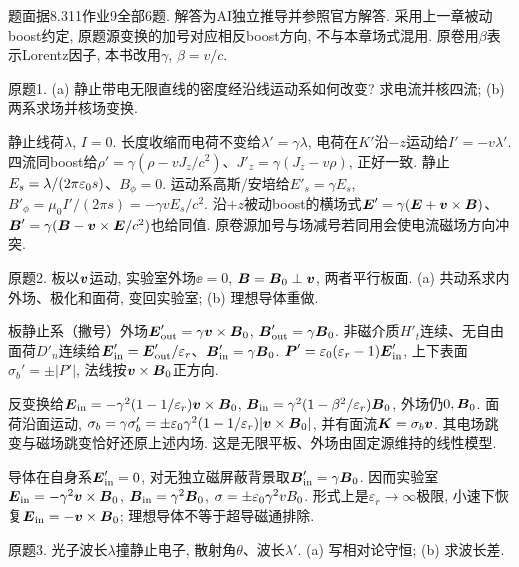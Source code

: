 题面据8.311作业9全部6题. 解答为AI独立推导并参照官方解答. 采用上一章被动boost约定, 原题源变换的加号对应相反boost方向, 不与本章场式混用. 原卷用$\beta$表示Lorentz因子, 本书改用$\gamma$, $\beta=v/c$.
\begin{exercise}
原题1. (a) 静止带电无限直线的密度经沿线运动系如何改变? 求电流并核四流; (b) 两系求场并核场变换.
\end{exercise}
\begin{solution}
静止线荷$\lambda$, $I=0$. 长度收缩而电荷不变给$\lambda'=\gamma\lambda$, 电荷在$K'$沿$-z$运动给$I'=-v\lambda'$. 四流同boost给$\rho'=\gamma(\rho-vJ_z/c^2)$、$J'_z=\gamma(J_z-v\rho)$, 正好一致. 静止$E_s=\lambda/(2\pi\varepsilon_0 s)$、$B_\phi=0$. 运动系高斯/安培给$E'_s=\gamma E_s$, $B'_\phi=\mu_0 I'/(2\pi s)=-\gamma vE_s/c^2$. 沿$+z$被动boost的横场式$\boldsymbol{E}'=\gamma(\boldsymbol{E}+\boldsymbol{v}\times\boldsymbol{B})$、$\boldsymbol{B}'=\gamma(\boldsymbol{B}-\boldsymbol{v}\times\boldsymbol{E}/c^2)$也给同值. 原卷源加号与场减号若同用会使电流磁场方向冲突.
\end{solution}
\begin{exercise}
原题2. 板以$\boldsymbol{v}$运动, 实验室外场$\ee=0$, $\boldsymbol{B}=\boldsymbol{B}_0\perp\boldsymbol{v}$, 两者平行板面. (a) 共动系求内外场、极化和面荷, 变回实验室; (b) 理想导体重做.
\end{exercise}
\begin{solution}
板静止系（撇号）外场$\boldsymbol{E}'_{\rm out}=\gamma\boldsymbol{v}\times\boldsymbol{B}_0$, $\boldsymbol{B}'_{\rm out}=\gamma\boldsymbol{B}_0$. 非磁介质$H'_t$连续、无自由面荷$D'_n$连续给$\boldsymbol{E}'_{\rm in}=\boldsymbol{E}'_{\rm out}/\varepsilon_r$、$\boldsymbol{B}'_{\rm in}=\gamma\boldsymbol{B}_0$. $\boldsymbol{P}'=\varepsilon_0(\varepsilon_r-1)\boldsymbol{E}'_{\rm in}$, 上下表面$\sigma_b'=\pm|P'|$, 法线按$\boldsymbol{v}\times\boldsymbol{B}_0$正方向.

反变换给$\boldsymbol{E}_{\rm in}=-\gamma^2(1-1/\varepsilon_r)\boldsymbol{v}\times\boldsymbol{B}_0$, $\boldsymbol{B}_{\rm in}=\gamma^2(1-\beta^2/\varepsilon_r)\boldsymbol{B}_0$, 外场仍$0,\boldsymbol{B}_0$. 面荷沿面运动, $\sigma_b=\gamma\sigma_b'=\pm\varepsilon_0\gamma^2(1-1/\varepsilon_r)|\boldsymbol{v}\times\boldsymbol{B}_0|$, 并有面流$\boldsymbol{K}=\sigma_b\boldsymbol{v}$. 其电场跳变与磁场跳变恰好还原上述内场. 这是无限平板、外场由固定源维持的线性模型.

导体在自身系$\boldsymbol{E}'_{\rm in}=0$, 对无独立磁屏蔽背景取$\boldsymbol{B}'_{\rm in}=\gamma\boldsymbol{B}_0$. 因而实验室$\boldsymbol{E}_{\rm in}=-\gamma^2\boldsymbol{v}\times\boldsymbol{B}_0$, $\boldsymbol{B}_{\rm in}=\gamma^2\boldsymbol{B}_0$, $\sigma=\pm\varepsilon_0\gamma^2vB_0$. 形式上是$\varepsilon_r\to\infty$极限, 小速下恢复$\boldsymbol{E}_{\rm in}=-\boldsymbol{v}\times\boldsymbol{B}_0$; 理想导体不等于超导磁通排除.
\end{solution}
\begin{exercise}
原题3. 光子波长$\lambda$撞静止电子, 散射角$\theta$、波长$\lambda'$. (a) 写相对论守恒; (b) 求波长差.
\end{exercise}

